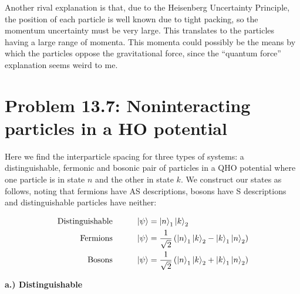\documentclass[10pt]{article} %
\begin{document}
Another rival explanation is that, due to the Heisenberg Uncertainty Principle, the position of
each particle is well known due to tight packing, so the momentum uncertainty must be very large.
This translates to the particles having a large range of momenta. This momenta could possibly be
the means by which the particles oppose the gravitational force, since the ``quantum force''
explanation seems weird to me.\\

\section{Problem 13.7: Noninteracting particles in a HO potential}
Here we find the interparticle spacing for three types of systems: a distinguishable,
fermonic and bosonic pair of particles in a QHO potential where one particle is in state $n$
and the other in state $k$. We construct our states as follows, noting that fermions have AS
descriptions, bosons have S descriptions and distinguishable particles have neither:

\begin{align*}
  \mbox{Distinguishable}&\hspace{1cm} \ket{\psi} = \ket{n}_1\ket{k}_2\\
  \mbox{Fermions}&\hspace{1cm} \ket{\psi}
  = \frac{1}{\sqrt{2}}\left(\ket{n}_1\ket{k}_2 - \ket{k}_1\ket{n}_2\right)\\
  \mbox{Bosons}&\hspace{1cm} \ket{\psi}
  = \frac{1}{\sqrt{2}}\left(\ket{n}_1\ket{k}_2 + \ket{k}_1\ket{n}_2\right)\\
\end{align*}

\textbf{a.) Distinguishable}
\end{document}
